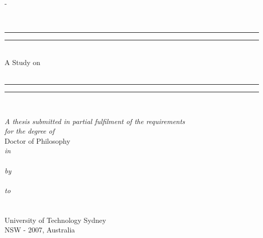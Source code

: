 \begin{titlingpage}
\begin{SingleSpace}

\calccentering{\unitlength} 
\begin{adjustwidth*}{\unitlength}{-\unitlength}
\begin{center}

~\\
\vspace{17mm}

\rule[0.5ex]{\linewidth}{2pt}\vspace*{-\baselineskip}\vspace*{3.2pt}
\rule[0.5ex]{\linewidth}{1pt}\\%
\noindent
{\LARGE{A Study on} \\[.25cm] \HUGE{\utstitle}} \\[1.5mm] %
\rule[0.5ex]{\linewidth}{1pt}\vspace*{-\baselineskip}\vspace{4pt}
\rule[0.5ex]{\linewidth}{2pt}\\
\vspace {15mm}

\emph{\large A thesis submitted in partial fulfilment of the requirements}\\
\vspace {0.1in}
\emph{\large for the degree of}\\
\vspace {10mm}
{\large Doctor of Philosophy}\\
\vspace{2mm}
\emph{in}\\
\vspace{1mm}
{\large \utsfield}\\
\vspace {10mm}
\emph{\large by}\\
\vspace{4mm}
{\bfseries \Large \utsname} \\ %

\vspace {10mm}
\emph{\large to}\\
\vspace{4mm}
{\large \utsschool\\
\vspace {1mm}
\large \utsfaculty \\
\vspace {2mm}
{\Large University of Technology Sydney}\\
\vspace {1mm}
{NSW - 2007, Australia}
}\\
\vspace{23mm}




\end{center}
\end{adjustwidth*}
\end{SingleSpace}
\end{titlingpage}
